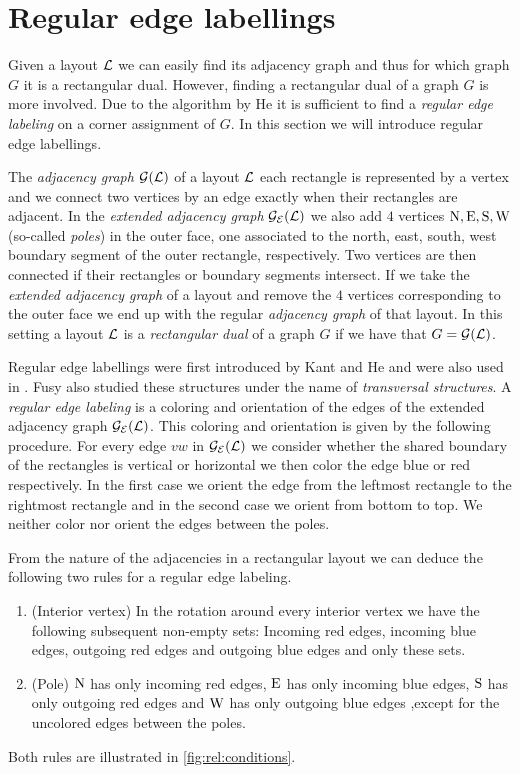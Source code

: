
\section{Regular edge labellings}
\label{s:rel}
\thispagestyle{plain}
  Given a layout $\mathcal{L}$ we can easily find its adjacency graph and thus for which graph $G$ it is a rectangular dual. However, finding a rectangular dual of a graph $G$ is more involved. Due to the algorithm by He \cite{He1993} it is sufficient to find a \emph{regular edge labeling} on a corner assignment of $G$. In this section we will introduce regular edge labellings.

  The \emph{ adjacency graph} $\mathcal{G}(\mathcal{L})$ of a layout $\mathcal{L}$ each rectangle is represented by a vertex and we connect two vertices by an edge exactly when their rectangles are adjacent. In the \emph{extended adjacency graph} $\mathcal{G}_{\mathcal{E}}(\mathcal{L})$ we also add $4$ vertices $\mathrm{N}, \mathrm{E}, \mathrm{S}, \mathrm{W}$ (so-called \emph{poles}) in the outer face, one associated to the north, east, south, west boundary segment of the outer rectangle, respectively. Two vertices are then connected if their rectangles or boundary segments intersect.
  If we take the \emph{extended adjacency graph} of a layout and remove the $4$ vertices corresponding to the outer face we end up with the regular \emph{adjacency graph} of that layout.
  In this setting a layout $\mathcal{L}$ is a \emph{rectangular dual} of a graph $G$ if we have that $G = \mathcal{G}(\mathcal{L})$.


  Regular edge labellings were first introduced by Kant and He \cite{Kant1997} and were also used in \cite{Eppstein2012}. Fusy also studied these structures \cite{Fusy2006,Fusy2009} under the name of \emph{transversal structures}.
  A \emph{regular edge labeling} is a coloring and orientation of the edges of the extended adjacency graph $\mathcal{G}_{\mathcal{E}}(\mathcal{L})$. This coloring and orientation is given by the following procedure. For every edge $vw$ in $\mathcal{G}_{\mathcal{E}}(\mathcal{L})$ we consider whether the shared boundary of the rectangles is vertical or horizontal we then color the edge blue or red respectively. In the first case we orient the edge from the leftmost rectangle to the rightmost rectangle and in the second case we orient from bottom to top. We neither color nor orient the edges between the poles.

  From the nature of the adjacencies in a rectangular layout we can deduce the following two rules for a regular edge labeling.
  \begin{enumerate}
    \item (Interior vertex) In the rotation around every interior vertex we have the following subsequent non-empty sets: Incoming red edges, incoming blue edges, outgoing red edges and outgoing blue edges and only these sets.
    \item (Pole) $\mathrm{N}$ has only incoming red edges, $\mathrm{E}$ has only incoming blue edges, $\mathrm{S}$ has only outgoing red edges and $\mathrm{W}$ has only outgoing blue edges ,except for the uncolored edges between the poles.
  \end{enumerate}
  Both rules are illustrated in \ref{fig:rel:conditions}.

